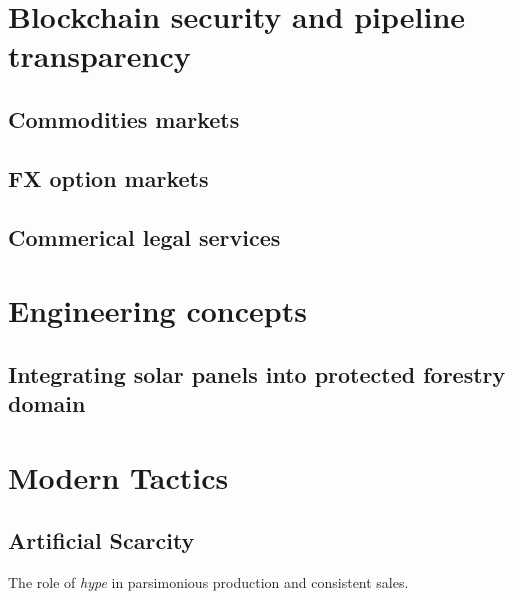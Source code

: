\documentclass[11pt]{article}
\begin{document}
\newpage
\section{Blockchain security and pipeline transparency}
\subsection{Commodities markets}
\subsection{FX option markets}
\subsection{Commerical legal services}

\section{Engineering concepts}
\subsection{Integrating solar panels into protected forestry domain}

\section{Modern Tactics}
\subsection{Artificial Scarcity}
The role of \textit{hype} in parsimonious production and consistent sales.

\newpage
\printbibliography
{}
\end{document}
